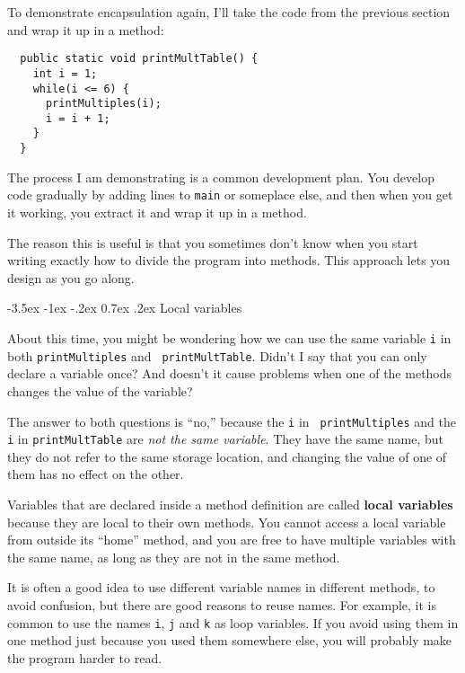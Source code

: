\documentclass{book}
\makeatletter
\renewcommand{\section}{\@startsection 
    {section} {1} {0mm}%
    {-3.5ex \@plus -1ex \@minus -.2ex}%
    {0.7ex \@plus.2ex}%
    {\normalfont\Large\bfseries}}
\makeatother
\begin{document}
To demonstrate encapsulation again, I'll take the code
from the previous section and wrap it up in a method:

\begin{verbatim}
  public static void printMultTable() {
    int i = 1;
    while(i <= 6) {
      printMultiples(i);
      i = i + 1;
    }
  }
\end{verbatim}
%
The process I am demonstrating is a common 
development plan.  You develop code gradually by adding
lines to {\tt main} or someplace else, and then when you get
it working, you extract it and wrap it up in a method.

The reason this is useful is that you sometimes don't know
when you start writing exactly how to divide the program into
methods.  This approach lets you design as you go along.

\section{Local variables}

About this time, you might be wondering how we can use the same
variable {\tt i} in both {\tt printMultiples} and {\tt
printMultTable}.  Didn't I say that you can only declare a variable
once?  And doesn't it cause problems when one of the methods changes
the value of the variable?

The answer to both questions is ``no,'' because the {\tt i} in {\tt
printMultiples} and the {\tt i} in {\tt printMultTable} are
{\em not the same variable}.  They have the same name, but
they do not refer to the same storage location, and changing
the value of one of them has no effect on the other.


Variables that are declared inside a method definition are
called {\bf local variables} because they are local to their
own methods.  You cannot access a local variable from outside
its ``home'' method, and you are free to have multiple
variables with the same name, as long as they are not in
the same method.

It is often a good idea to use different variable names in
different methods, to avoid confusion, but there are good
reasons to reuse names.  For example, it is common to
use the names {\tt i}, {\tt j} and {\tt k} as loop variables.
If you avoid using them in one method just because you
used them somewhere else, you will probably make the program
harder to read.
\end{document}
